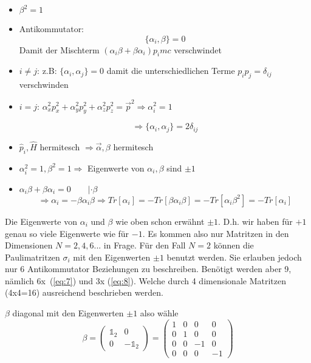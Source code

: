 \begin{itemize}
\item  \(\boxed{\beta^2=1}\)
\item Antikommutator: 
  \begin{equation}
    \label{eq:8}
    \boxed{\{\alpha_i,\beta\}=0}
  \end{equation}
Damit der Mischterm \((\alpha_i\beta+\beta\alpha_i)p_i mc\)  verschwindet 

\item \(i\neq j\): z.B:  \(\{\alpha_i,\alpha_j\}=0\) damit die unterschiedlichen Terme \(p_ip_j = \delta_{ij}\) verschwinden
\item \(i=j\): \(\alpha_x^2p_x^2+\alpha_y^2p_y^2+\alpha_z^2p_z^2=\vec p^2 \Rightarrow \alpha_i^2 = 1\)

\begin{equation}
  \label{eq:7}
  \Rightarrow \boxed{\{\alpha_i,\alpha_j\}=2\delta_{ij}}
\end{equation}

\item \(\hat p_i,\hat H\) hermitesch \(\Rightarrow \vec\alpha,\beta\) hermitesch
\item \(\alpha_i^2=1,\beta^2=1 \Rightarrow \) Eigenwerte von \(\alpha_i,\beta\) sind \(\pm 1\)
\item \(\alpha_i\beta + \beta\alpha_i=0\qquad |\cdot \beta\)
\[\Rightarrow \alpha_i=-\beta\alpha_i\beta \Rightarrow Tr[\alpha_i] = -Tr[\beta\alpha_i\beta]=-Tr[\alpha_i\beta^2]=-Tr[\alpha_i]\]
\end{itemize}


Die Eigenwerte von \(\alpha_i\) und \(\beta\) wie oben schon erwähnt \(\pm 1\). D.h. wir haben für \(+1\) genau so viele Eigenwerte wie für \(-1\). Es kommen also nur Matritzen in den Dimensionen \(N=2,4,6...\) in Frage. Für den Fall \(N=2\) können die Paulimatritzen \(\sigma_i\) mit den Eigenwerten \(\pm 1\) benutzt werden. Sie erlauben jedoch nur 6 Antikommutator Beziehungen zu beschreiben. Benötigt werden aber 9, nämlich 6x~(\ref{eq:7}) und 3x (\ref{eq:8}). Welche durch 4 dimensionale Matritzen (4x4=16) ausreichend beschrieben werden.


\(\beta\) diagonal mit den Eigenwerten \(\pm 1\) also wähle 
\begin{equation}
  \label{eq:9}
  \beta= \begin{pmatrix}\mathbb 1_2&0\\ 0&-\mathbb 1_2\end{pmatrix} = \begin{pmatrix}1&0&0&0\\ 0&1&0&0\\ 0&0&-1&0\\0&0&0&-1\end{pmatrix}
\end{equation}

